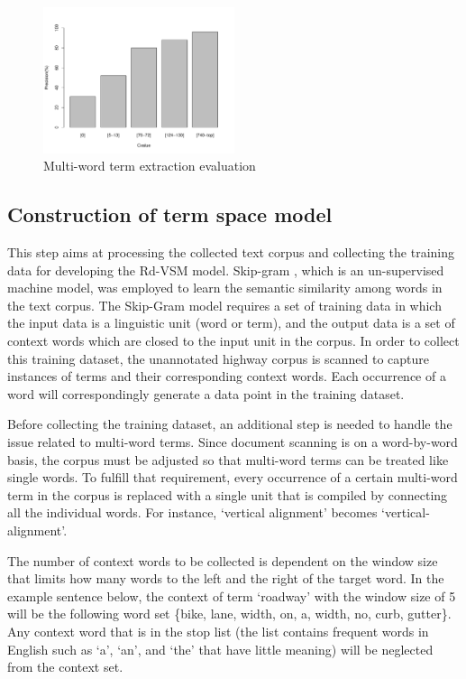 \documentclass[Journal,InsideFigs, DoubleSpace]{ascelike} %
\begin{document}
\begin{figure}[t]
	\centering
	\includegraphics[width=0.5\textwidth]{Figure3_term_precision}
	\caption{Multi-word term extraction evaluation}
	\label{fig:term_precision}
\end{figure}
%
\subsection{Construction of term space model}
%
This step aims at processing the collected text corpus and collecting the training data for developing the Rd-VSM model. Skip-gram \cite{mikolov13a}, which is an un-supervised machine model, was employed to learn the semantic similarity among words in the text corpus. The Skip-Gram model requires a set of training data in which the input data is a linguistic unit (word or term), and the output data is a set of context words which are closed to the input unit in the corpus. In order to collect this training dataset, the unannotated highway corpus is scanned to capture instances of terms and their corresponding context words. Each occurrence of a word will correspondingly generate a data point in the training dataset.
\par
Before collecting the training dataset, an additional step is needed to handle the issue related to multi-word terms. Since document scanning is on a word-by-word basis, the corpus must be adjusted so that multi-word terms can be treated like single words. To fulfill that requirement, every occurrence of a certain multi-word term in the corpus is replaced with a single unit that is compiled by connecting all the individual words. For instance, `vertical alignment' becomes `vertical-alignment'.
\par
The number of context words to be collected is dependent on the window size that limits how many words to the left and the right of the target word. In the example sentence below, the context of term `roadway' with the window size of 5 will be the following word set \{bike, lane, width, on, a, width, no, curb, gutter\}. Any context word that is in the stop list (the list contains frequent words in English such as `a', `an', and `the' that have little meaning) will be neglected from the context set.
\end{document}
